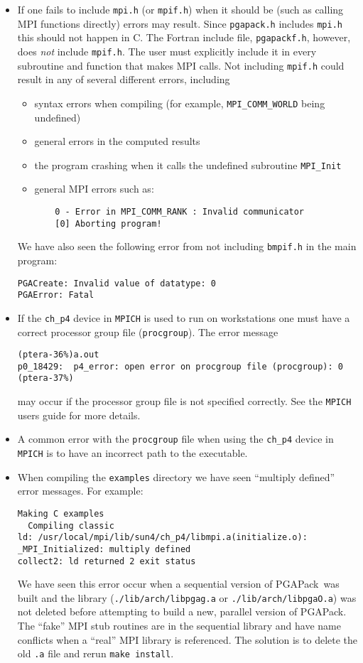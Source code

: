 \documentclass{report}
\newcommand{\pga}{PGAPack}
\begin{document}
\begin{itemize}
\item If one fails to include {\tt mpi.h} (or {\tt mpif.h}) when it
should be (such as calling MPI functions directly) errors may result.  Since
{\tt pgapack.h} includes {\tt mpi.h} this should not happen in C.
The Fortran include file, {\tt pgapackf.h}, however, does {\em not} include
{\tt mpif.h}.  The user must explicitly include it in every subroutine and
function that makes MPI calls.  Not including {\tt mpif.h} could result in
any of several different errors, including
\begin{itemize}
\item syntax errors when compiling (for example, {\tt MPI\_COMM\_WORLD} being
undefined)
\item general errors in the computed results
\item the program crashing when it calls the undefined subroutine {\tt MPI\_Init}
\item general MPI errors such as:
\begin{verbatim}
	0 - Error in MPI_COMM_RANK : Invalid communicator
	[0] Aborting program!
\end{verbatim}
\end{itemize}
We have also seen the following error from not including {\tt bmpif.h} in the
main program:
\begin{verbatim}
PGACreate: Invalid value of datatype: 0
PGAError: Fatal
\end{verbatim}

\item If the {\tt ch\_p4} device in {\tt MPICH} is used to run on workstations 
one must have a correct processor group file ({\tt procgroup}).  The error
message
\begin{verbatim}
(ptera-36%)a.out
p0_18429:  p4_error: open error on procgroup file (procgroup): 0
(ptera-37%)
\end{verbatim}
may occur if the processor group file is not specified correctly.  See the
{\tt MPICH} users guide for more details.

\item A common error with the {\tt procgroup} file when using the 
{\tt ch\_p4} device in {\tt MPICH} is to have an incorrect path to the
executable.

\item When compiling the {\tt examples} directory we have seen ``multiply
defined'' error messages. For example:
{\small
\begin{verbatim}
Making C examples
  Compiling classic
ld: /usr/local/mpi/lib/sun4/ch_p4/libmpi.a(initialize.o): _MPI_Initialized: multiply defined
collect2: ld returned 2 exit status
\end{verbatim}
}
We have seen this error occur when a sequential version of \pga\ was built and
the library ({\tt ./lib/arch/libpgag.a} or {\tt ./lib/arch/libpgaO.a}) was not
deleted before attempting to build a new, parallel version of \pga.  The
``fake'' MPI stub routines are in the sequential library and have name
conflicts when a ``real'' MPI library is referenced.  The solution is to
delete the old {\tt .a} file and rerun {\tt make install}.


\end{itemize}
\end{document}
